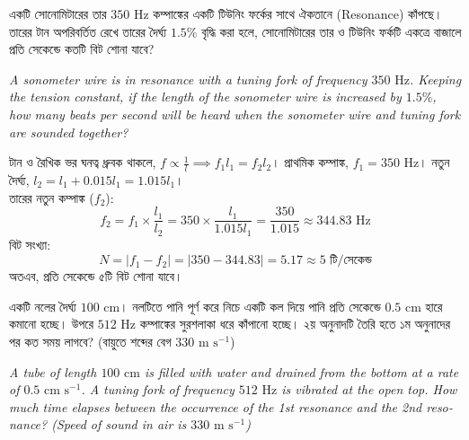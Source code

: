 \documentclass[12pt, a4paper]{article}
\begin{document}
\newpage
\begin{tcolorbox}[questionbox={প্রশ্ন (Question) 1}]
\noindent
একটি সোনোমিটারের তার $350\text{ Hz}$ কম্পাঙ্কের একটি টিউনিং ফর্কের সাথে ঐকতানে (Resonance) কাঁপছে। তারের টান অপরিবর্তিত রেখে তারের দৈর্ঘ্য $1.5\%$ বৃদ্ধি করা হলে, সোনোমিটারের তার ও টিউনিং ফর্কটি একত্রে বাজালে প্রতি সেকেন্ডে কতটি বিট শোনা যাবে?

\vspace{0.8em}
\begin{english}
\noindent\textit{\color{darkgray}
A sonometer wire is in resonance with a tuning fork of frequency $350\text{ Hz}$. Keeping the tension constant, if the length of the sonometer wire is increased by $1.5\%$, how many beats per second will be heard when the sonometer wire and tuning fork are sounded together?
}
\end{english}
\end{tcolorbox}

\vspace{1em}

\begin{tcolorbox}[solutionbox={সমাধান (Solution)}]
\noindent
টান ও রৈখিক ভর ঘনত্ব ধ্রুবক থাকলে, $f \propto \frac{1}{l} \implies f_1 l_1 = f_2 l_2$। প্রাথমিক কম্পাঙ্ক, $f_1 = 350\text{ Hz}$। নতুন দৈর্ঘ্য, $l_2 = l_1 + 0.015 l_1 = 1.015 l_1$। \\
তারের নতুন কম্পাঙ্ক ($f_2$):
\[ f_2 = f_1 \times \frac{l_1}{l_2} = 350 \times \frac{l_1}{1.015 l_1} = \frac{350}{1.015} \approx 344.83\text{ Hz} \]
বিট সংখ্যা:
\[ N = |f_1 - f_2| = |350 - 344.83| = 5.17 \approx 5\text{ টি/সেকেন্ড} \]
অতএব, প্রতি সেকেন্ডে ৫টি বিট শোনা যাবে।
\end{tcolorbox}

\vspace{1.5em}

\begin{tcolorbox}[questionbox={প্রশ্ন (Question) 2}]
\noindent
একটি নলের দৈর্ঘ্য $100\text{ cm}$। নলটিতে পানি পূর্ণ করে নিচে একটি কল দিয়ে পানি প্রতি সেকেন্ডে $0.5\text{ cm}$ হারে কমানো হচ্ছে। উপরে $512\text{ Hz}$ কম্পাঙ্কের সুরশলাকা ধরে কাঁপানো হচ্ছে। ২য় অনুনাদটি তৈরি হতে ১ম অনুনাদের পর কত সময় লাগবে? (বায়ুতে শব্দের বেগ $330\text{ m s}^{-1}$)

\vspace{0.8em}
\begin{english}
\noindent\textit{\color{darkgray}
A tube of length $100\text{ cm}$ is filled with water and drained from the bottom at a rate of $0.5\text{ cm s}^{-1}$. A tuning fork of frequency $512\text{ Hz}$ is vibrated at the open top. How much time elapses between the occurrence of the 1st resonance and the 2nd resonance? (Speed of sound in air is $330\text{ m s}^{-1}$)
}
\end{english}
\end{tcolorbox}
\end{document}
